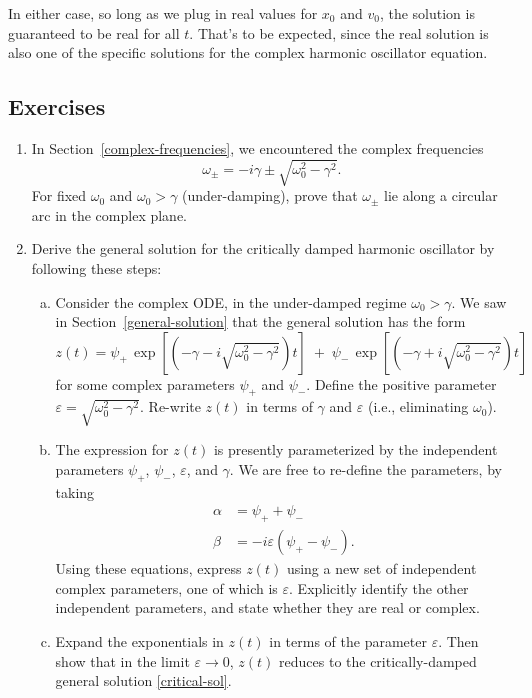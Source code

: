 \documentclass[10pt,a4paper]{article}
\begin{document}
In either case, so long as we plug in real values for $x_0$ and $v_0$,
the solution is guaranteed to be real for all $t$.  That's to be
expected, since the real solution is also one of the specific
solutions for the complex harmonic oscillator equation.

\subsection{Exercises}
\label{exercises}

\begin{enumerate}
\item
  In Section~\ref{complex-frequencies}, we encountered the complex
  frequencies
  \begin{equation}
    \omega_\pm = -i\gamma \pm \sqrt{\omega_0^2 - \gamma^2}.
  \end{equation}
  For fixed $\omega_0$ and $\omega_0 > \gamma$ (under-damping), prove
  that $\omega_\pm$ lie along a circular arc in the complex plane.

\item
  Derive the general solution for the critically damped harmonic
  oscillator by following these steps:
  \begin{enumerate}[(a)]
  \item
    Consider the complex ODE, in the under-damped regime $\omega_0 >
    \gamma$. We saw in Section~\ref{general-solution} that the general
    solution has the form
    \begin{equation}
      z(t) = \psi_+ \, \exp\left[\left(-\gamma  - i \sqrt{\omega_0^2 - \gamma^2}\right)t\right] \; +\; \psi_- \, \exp\left[\left(-\gamma +i\sqrt{\omega_0^2 - \gamma^2}\right)t\right]
    \end{equation}
    for some complex parameters $\psi_+$ and $\psi_-$. Define the
    positive parameter $\varepsilon = \sqrt{\omega_0^2 - \gamma^2}$.
    Re-write $z(t)$ in terms of $\gamma$ and $\varepsilon$ (i.e.,
    eliminating $\omega_0$).

  \item
    The expression for $z(t)$ is presently parameterized by the
    independent parameters $\psi_+$, $\psi_-$, $\varepsilon$, and
    $\gamma$. We are free to re-define the parameters, by taking
    \begin{align}
      \alpha &= \psi_+ + \psi_- \\
      \beta &= -i\varepsilon(\psi_+ - \psi_-).
    \end{align}
    Using these equations, express $z(t)$ using a new set of
    independent complex parameters, one of which is $\varepsilon$.
    Explicitly identify the other independent parameters, and state
    whether they are real or complex.
  \item
    Expand the exponentials in $z(t)$ in terms of the parameter
    $\varepsilon$. Then show that in the limit $\varepsilon
    \rightarrow 0$, $z(t)$ reduces to the critically-damped general
    solution \eqref{critical-sol}.
  \end{enumerate}


\end{enumerate}
\end{document}
